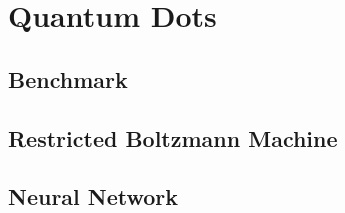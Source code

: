 \documentclass[Thesis.tex]{subfiles}
\begin{document}
\chapter{Quantum Dots}
\label{chp:quantum-dots}

\section{Benchmark}

\section{Restricted Boltzmann Machine}

\section{Neural Network}
\end{document}
